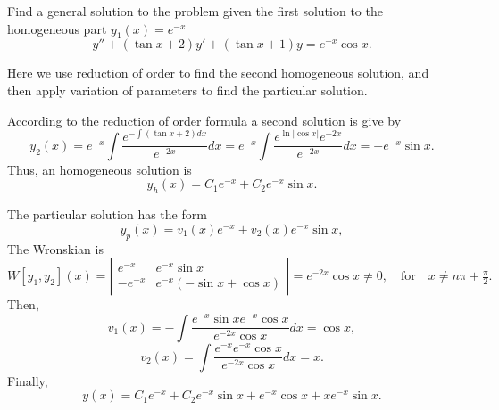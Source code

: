 \documentclass[11pt]{article}
\begin{document}
\begin{problem}
Find a general solution to the problem given the first solution to the homogeneous part $y_{1}(x)=e^{-x}$
\begin{equation*}
y''+(\tan x +2)y'+(\tan x+1)y=e^{-x}\cos x.
\end{equation*}
\end{problem}
\begin{solution}
Here we use reduction of order to find the second homogeneous solution, and then apply variation of parameters to find the particular solution.

According to the reduction of order formula a second solution is give by
\begin{equation*}
y_{2}(x)=e^{-x}\int \frac{e^{-\int(\tan x + 2)dx}}{e^{-2x}}dx = e^{-x}\int \frac{e^{\ln|\cos x|}e^{-2x}}{e^{-2x}}dx=-e^{-x}\sin x.
\end{equation*}
Thus, an homogeneous solution is
\[y_{h}(x)=C_{1}e^{-x}+C_{2}e^{-x}\sin x.\]

The particular solution has the form
\[y_{p}(x)=v_{1}(x)e^{-x}+v_{2}(x)e^{-x}\sin x,\]
The Wronskian is
\begin{equation*}
W[y_{1},y_{2}](x) = \left| \begin{array}{cc} e^{-x} & e^{-x}\sin x \\
-e^{-x} & e^{-x}(-\sin x +\cos x) \end{array} \right| = e^{-2x}\cos x \neq 0, \quad \text{for} \quad x \neq n\pi +\tfrac{\pi}{2}.
\end{equation*}
Then,
\begin{equation*}
v_{1}(x) = - \int \dfrac{e^{-x}\sin x e^{-x}\cos x}{e^{-2x}\cos x}dx =\cos x,
\end{equation*}
\begin{equation*}
v_{2}(x) =  \int \dfrac{e^{-x} e^{-x}\cos x}{e^{-2x}\cos x}dx =x.
\end{equation*}
Finally,
\[\boxed{y(x)=C_{1}e^{-x}+C_{2}e^{-x}\sin x + e^{-x}\cos x  + xe^{-x}\sin x.}\]
\end{solution}
\end{document}
